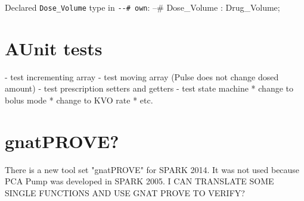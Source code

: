Declared \lstinline{Dose_Volume} type in \lstinline{--# own}: --#     Dose_Volume : Drug_Volume;


\section{AUnit tests}
\label{verification:aunit}
- test incrementing array
- test moving array (Pulse does not change dosed amount)
- test prescription setters and getters
- test state machine
	* change to bolus mode
	* change to KVO rate
	* etc.



\section{gnatPROVE?}
\label{verification:gnatprove}

There is a new tool set "gnatPROVE" for SPARK 2014. It was not used because PCA Pump was developed in SPARK 2005.
I CAN TRANSLATE SOME SINGLE FUNCTIONS AND USE GNAT PROVE TO VERIFY?
